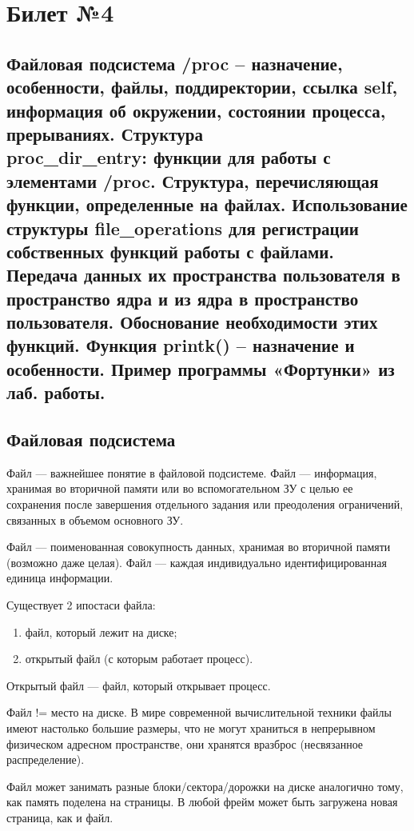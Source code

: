 \chapter{Билет №4}

\section*{Файловая подсистема /proc – назначение, особенности, файлы, поддиректории, ссылка self, информация об окружении, состоянии процесса, прерываниях. Структура\\ proc\_dir\_entry: функции для работы с элементами /proc. Структура, перечисляющая функции, определенные на файлах. Использование структуры file\_operations для регистрации собственных функций работы с файлами. Передача данных их пространства пользователя в пространство ядра и из ядра в пространство пользователя. Обоснование необходимости этих функций. Функция printk() – назначение и особенности. Пример программы «Фортунки» из лаб. работы.}

\section{Файловая подсистема}
Файл --- важнейшее понятие в файловой подсистеме. Файл --- информация, хранимая во вторичной памяти или во вспомогательном ЗУ с целью ее сохранения после завершения отдельного задания или преодоления ограничений, связанных в объемом основного ЗУ.

Файл --- поименованная совокупность данных, хранимая во вторичной памяти (возможно даже целая). Файл --- каждая индивидуально идентифицированная единица информации.

Существует 2 ипостаси файла:
\begin{enumerate}
	\item файл, который лежит на диске;
	\item открытый файл (с которым работает процесс).
\end{enumerate}

Открытый файл --- файл, который открывает процесс.

Файл != место на диске. В мире современной вычислительной техники файлы имеют настолько большие размеры, что не могут храниться в непрерывном физическом адресном пространстве, они хранятся вразброс (несвязанное распределение).

Файл может занимать разные блоки/сектора/дорожки на диске аналогично тому, как память поделена на страницы. В любой фрейм может быть загружена новая страница, как и файл. 


